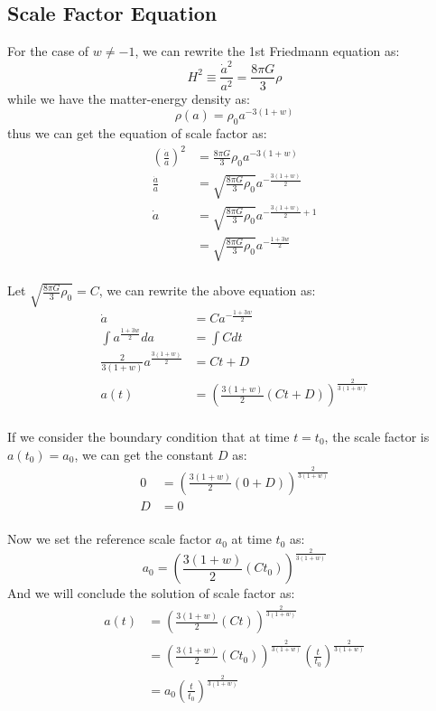\subsection{Scale Factor Equation}
\begin{foundation}
    For the case of $w \neq -1$, we can rewrite the 1st Friedmann equation as:
    \[
        H^2 \equiv \frac{\dot{a}^2}{a^2} = \frac{8\pi G}{3}\rho
    \]
    while we have the matter-energy density as:
    \[
        \rho(a) = \rho_0 a^{-3(1+w)}
    \]
    thus we can get the equation of scale factor as:
    \begin{align*}
        \left( \frac{\dot{a}}{a} \right)^2 &= \frac{8\pi G}{3} \rho_0 a^{-3(1+w)} \\
        \frac{\dot{a}}{a} &= \sqrt{\frac{8\pi G}{3} \rho_0} a^{-\frac{3(1+w)}{2}} \\
        \dot{a} &= \sqrt{\frac{8\pi G}{3} \rho_0} a^{-\frac{3(1+w)}{2} + 1} \\
         &= \sqrt{\frac{8\pi G}{3} \rho_0} a^{-\frac{1 + 3w}{2}}
    \end{align*} \\

    Let $\sqrt{\frac{8\pi G}{3} \rho_0} = C$, we can rewrite the above equation as:
    \begin{align*}
        \dot{a} &= C a^{-\frac{1 + 3w}{2}} \\
        \int a^{\frac{1 + 3w}{2}} da &= \int C dt \\
        \frac{2}{3(1+w)} a^{\frac{3(1+w)}{2}} &= Ct + D \\
        a(t) &= \left( \frac{3(1+w)}{2} (Ct + D) \right)^{\frac{2}{3(1+w)}}
    \end{align*} \\

    If we consider the boundary condition that at time $t = t_0$, the scale factor is $a(t_0) = a_0$, we can get the constant $D$ as:
    \begin{align*}
        0 &= \left( \frac{3(1+w)}{2} (0 + D) \right)^{\frac{2}{3(1+w)}} \\
        D &= 0
    \end{align*} \\

    Now we set the reference scale factor $a_0$ at time $t_0$ as:
    \[
        a_0 = \left( \frac{3(1+w)}{2} (Ct_0) \right)^{\frac{2}{3(1+w)}}
    \]
    And we will conclude the solution of scale factor as:
    \begin{align*}
        a(t) &= \left( \frac{3(1+w)}{2} (Ct) \right)^{\frac{2}{3(1+w)}} \\
             &= \left( \frac{3(1+w)}{2} (Ct_0) \right)^{\frac{2}{3(1+w)}} \left( \frac{t}{t_0} \right)^{\frac{2}{3(1+w)}} \\
             &= a_0 \left( \frac{t}{t_0} \right)^{\frac{2}{3(1+w)}}
    \end{align*}
\end{foundation}

